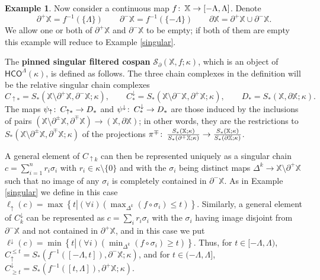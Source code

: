 \documentclass[11pt]{amsart}
\theoremstyle{definition}
\newtheorem{ex}[theorem]{Example}
\theoremstyle{remark}
\numberwithin{equation}{section}
\def\co{\colon\thinspace}
\begin{document}
\begin{ex}  \label{pinsing}
	Now consider a continuous map $f\co \mathbb{X}\to [-\Lambda,\Lambda]$.  Denote \[ \partial^+\mathbb{X}=f^{-1}(\{\Lambda\})\qquad \partial^-\mathbb{X}=f^{-1}(\{-\Lambda\}) \qquad \partial \mathbb{X}=\partial^+\mathbb{X}\cup \partial^-\mathbb{X}.\]  We allow one or both of $\partial^+\mathbb{X}$ and $\partial^-\mathbb{X}$ to be empty; if both of them are empty this example will reduce to Example \ref{singular}.
	
	The \textbf{pinned singular filtered cospan} $\mathcal{S}_{\partial}(\mathbb{X},f;\kappa)$, which is an object of $\mathsf{HCO}^{\Lambda}(\kappa)$, is defined as follows.  The three chain complexes in the definition will be the relative singular chain complexes \[ 
	C_{\uparrow *}=S_*(\mathbb{X}\setminus \partial^+\mathbb{X},\partial^-\mathbb{X};\kappa),\qquad C^{\downarrow}_{*}=S_*(\mathbb{X}\setminus\partial^-\mathbb{X},\partial^+\mathbb{X};\kappa),\qquad D_*=S_*(\mathbb{X},\partial \mathbb{X};\kappa).\]  The maps $\psi_{\uparrow}\co C_{\uparrow *}\to D_*$  and $\psi^{\downarrow}\co C^{\downarrow}_{*}\to D_*$ are those induced by the inclusions of pairs $(\mathbb{X}\setminus \partial^{\pm}\mathbb{X},\partial^{\mp}\mathbb{X})\to (\mathbb{X},\partial\mathbb{X})$; in other words, they are the restrictions to $S_*(\mathbb{X}\setminus\partial^{\pm}\mathbb{X},\partial^{\mp}\mathbb{X};\kappa)$ of the projections $\pi^{\mp}\co \frac{S_*(\mathbb{X};\kappa)}{S_*(\partial^{\mp}\mathbb{X};\kappa)}\to \frac{S_*(\mathbb{X};\kappa)}{S_*(\partial\mathbb{X};\kappa)}$.
	
	A general element of $C_{\uparrow k}$ can then be represented uniquely as a singular chain $c=\sum_{i=1}^{n}r_i\sigma_i$ with $r_i\in \kappa\setminus\{0\}$ and with the $\sigma_i$ being distinct maps $\Delta^k\to \mathbb{X}\setminus \partial^+\mathbb{X}$ such that no image of any $\sigma_i$ is completely contained in $\partial^-\mathbb{X}$.  As in Example \ref{singular} we define in this case $\ell_{\uparrow}(c)=\max\left\{t \left|(\forall i)\left(\max_{\Delta^k}(f\circ\sigma_i)\leq t\right)\right.\right\}$.
	Similarly, a general element of $C^{\downarrow}_{k}$ can be represented as $c=\sum_ir_i\sigma_i$ with the $\sigma_i$ having image disjoint from $\partial^-\mathbb{X}$ and not contained in $\partial^+\mathbb{X}$, and in this case we put $\ell^{\downarrow}(c)=\min\left\{t\left|(\forall i)\left(\min_{\Delta^k}(f\circ\sigma_i)\geq t\right)\right.\right\}$.  Thus, for $t\in [-\Lambda,\Lambda)$, $C_{\uparrow}^{\leq t}=S_*(f^{-1}([-\Lambda,t]),\partial^-\mathbb{X};\kappa)$, and for $t\in (-\Lambda,\Lambda]$, $C^{\downarrow}_{\geq t}=S_*(f^{-1}([t,\Lambda]),\partial^+\mathbb{X};\kappa)$.
\end{ex}
\end{document}
